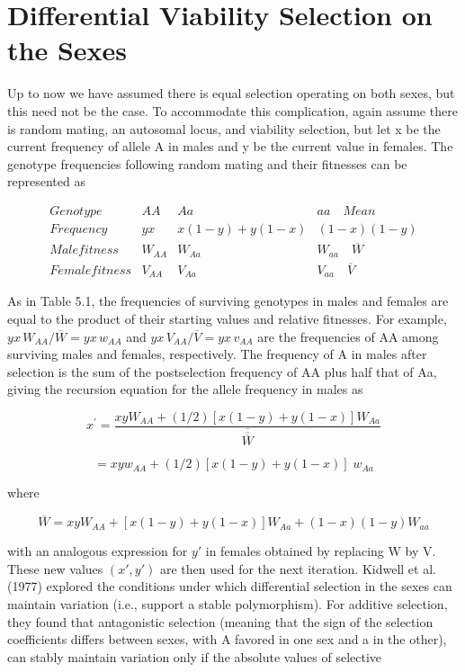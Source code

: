 \documentclass{article}
\begin{document}
\section{Differential Viability Selection on the Sexes}
Up to now we have assumed there is equal selection operating on both sexes, but this need not be the case. To accommodate this complication, again assume there is random mating, an autosomal locus, and viability selection, but let x be the current frequency of allele A in males and y be the current value in females. The genotype frequencies following random mating and their fitnesses can be represented as

\begin{equation}
\begin{array}{cccc}Genotype&AA&Aa&aa\quad Mean\\ Frequency&yx&x(1-y)+y(1-x)&(1-x)(1-y)\\ Male fitness&W_{AA}&W_{Aa}&W_{aa}\quad\overline{W}\\ Female fitness&V_{AA}&V_{Aa}&V_{aa}\quad\overline{V}\end{array}
\end{equation}

As in Table 5.1, the frequencies of surviving genotypes in males and females are equal to the product of their starting values and relative fitnesses. For example,  $ yx\,W_{AA}/\overline{W}=yx\,w_{AA} $ and  $ yx\,V_{AA}/\overline{V}=yx\,v_{AA} $ are the frequencies of AA among surviving males and females, respectively. The frequency of A in males after selection is the sum of the postselection frequency of AA plus half that of Aa, giving the recursion equation for the allele frequency in males as

\begin{equation}
x^{\prime}=\frac{x y W_{A A}+(1/2)[x(1-y)+y(1-x)]W_{A a}}{\overline{\overline{\overline{W}}}}
\tag{5.4a}
\label{eq:5_4a}
\end{equation}

\begin{equation}
=x y w_{A A}+(1/2)[x(1-y)+y(1-x)]\;w_{A a}
\tag{5.4b}
\label{eq:5_4b}
\end{equation}

where

\begin{equation}
\overline{W}=x y W_{A A}+\left[x(1-y)+y(1-x)\right]W_{A a}+(1-x)(1-y)W_{a a}
\tag{5.4c}
\label{eq:5_4c}
\end{equation}

with an analogous expression for  $ y' $ in females obtained by replacing W by V. These new values  $ (x', y') $ are then used for the next iteration. Kidwell et al. (1977) explored the conditions under which differential selection in the sexes can maintain variation (i.e., support a stable polymorphism). For additive selection, they found that antagonistic selection (meaning that the sign of the selection coefficients differs between sexes, with A favored in one sex and a in the other), can stably maintain variation only if the absolute values of selective
\end{document}
